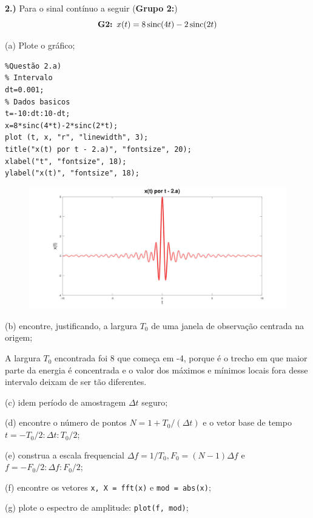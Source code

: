 \documentclass[10pt]{article}
\DeclareMathOperator{\sinc}{sinc}
\begin{document}
\textbf{2.)} Para o sinal contínuo a seguir (\textbf{Grupo 2:})
\[\text{\textbf{G2: }} x(t) = 8\sinc(4t) - 2\sinc(2t)\]

(a) Plote o gráfico;

\begin{verbatim}
%Questão 2.a)
% Intervalo
dt=0.001;
% Dados basicos
t=-10:dt:10-dt;
x=8*sinc(4*t)-2*sinc(2*t);
plot (t, x, "r", "linewidth", 3);
title("x(t) por t - 2.a)", "fontsize", 20);
xlabel("t", "fontsize", 18);
ylabel("x(t)", "fontsize", 18);
\end{verbatim}

\begin{figure}[h]
    \includegraphics[scale=0.25]{questao2a}
    \centering
\end{figure}

(b) encontre, justificando, a largura $T_0$ de uma janela de observação centrada na origem;

\vspace{\baselineskip}

A largura $T_0$ encontrada foi 8 que começa em -4, porque é o trecho em que maior parte da energia é concentrada e o valor dos máximos e mínimos locais fora desse intervalo deixam de ser tão diferentes.

\vspace{\baselineskip}

(c) idem período de amostragem $\Delta t$ seguro;

(d) encontre o número de pontos $N = 1 + T_0 / (\Delta t)$ e o vetor base de tempo $t = -T_0 / 2 : \Delta t : T_0 / 2$;

(e) construa a escala frequencial $\Delta f = 1 / T_0, F_0 = (N - 1)\Delta f$ e $f = -F_0 / 2 : \Delta f : F_0 / 2$;

(f) encontre os vetores \texttt{x, X = fft(x)} e \texttt{mod = abs(x)};

(g) plote o espectro de amplitude: \texttt{plot(f, mod)};
\end{document}
